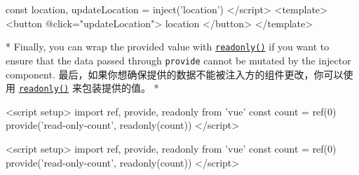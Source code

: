 \begin{paracol}{2}
\begin{codeHtml}
const { location, updateLocation } = inject('location')
</script>
<template>
  <button @click="updateLocation">{{ location }}</button>
</template>
\end{codeHtml}
\switchcolumn[0]*%
Finally, you can wrap the provided value with
\href{https://vuejs.org/api/reactivity-core.html\#readonly}{\texttt{readonly()}}
if you want to ensure that the data passed through \texttt{provide}
cannot be mutated by the injector component.
\switchcolumn
最后，如果你想确保提供的数据不能被注入方的组件更改，你可以使用
\href{https://cn.vuejs.org/api/reactivity-core.html\#readonly}{\texttt{readonly()}}
来包装提供的值。
\switchcolumn[0]*%
\begin{codeHtml}
<script setup>
import { ref, provide, readonly } from 'vue'
const count = ref(0)
provide('read-only-count', readonly(count))
</script>
\end{codeHtml}
\switchcolumn
\begin{codeHtml}
<script setup>
import { ref, provide, readonly } from 'vue'
const count = ref(0)
provide('read-only-count', readonly(count))
</script>
\end{codeHtml}
\end{paracol}

